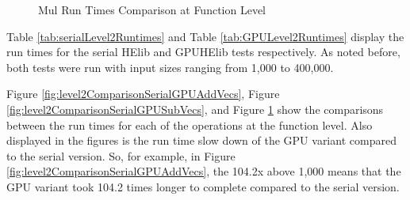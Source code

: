 \begin{figure}[p]
\centering
{}

\caption{Mul Run Times Comparison at Function Level}
\label{fig:level2ComparisonSerialGPUMulVecs}
\end{figure}

Table \ref{tab:serialLevel2Runtimes} and Table \ref{tab:GPULevel2Runtimes} display the run times for the serial HElib and GPUHElib tests respectively. As noted before, both tests were run with input sizes ranging from 1,000 to 400,000.

Figure \ref{fig:level2ComparisonSerialGPUAddVecs}, Figure \ref{fig:level2ComparisonSerialGPUSubVecs}, and Figure \ref{fig:level2ComparisonSerialGPUMulVecs} show the comparisons between the run times for each of the operations at the function level. Also displayed in the figures is the run time slow down of the GPU variant compared to the serial version. So, for example, in Figure \ref{fig:level2ComparisonSerialGPUAddVecs}, the 104.2x above 1,000 means that the GPU variant took 104.2 times longer to complete compared to the serial version.

